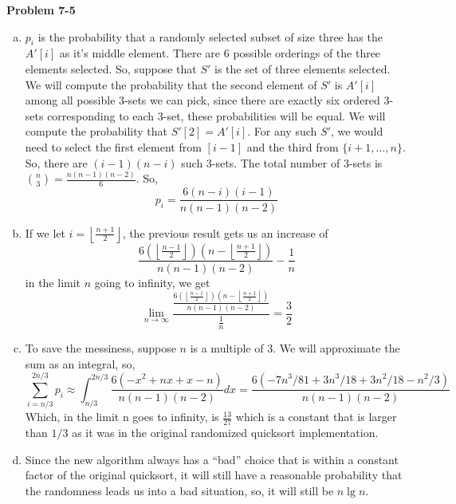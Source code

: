 \documentclass{article}
\begin{document}
\noindent\textbf{Problem 7-5}\\
\begin{enumerate}[a.]
\item
$p_i$ is the probability that a randomly selected subset of size three has the $A'[i]$ as it's middle element. There are $6$ possible orderings of the three elements selected. So, suppose that $S'$ is the set of three elements selected. We will compute the probability that the second element of $S'$ is $A'[i]$ among all possible 3-sets we can pick, since there are exactly six ordered 3-sets corresponding to each 3-set, these probabilities will be equal. We will compute the probability that $S'[2] = A'[i]$. For any such $S'$, we would need to select the first element from $[i-1]$ and the third from $\{i+1,\ldots,n\}$. So, there are $(i-1)(n-i)$ such 3-sets. The total number of 3-sets is $\binom{n}{3} = \frac{n(n-1)(n-2)}{6}$. So, 
\[
p_i = \frac{6(n-i)(i-1)}{n(n-1)(n-2)}
\]

\item
If we let $i = \left\lfloor \frac{n+1}{2}\right\rfloor$, the previous result gets us an increase of 
\[
\frac{6(\left\lfloor\frac{n-1}{2}\right\rfloor)(n -\left\lfloor \frac{n+1}{2}\right\rfloor)}{n(n-1)(n-2)} - \frac{1}{n}
\]
in the limit $n$ going to infinity, we get
\[
\lim_{n\rightarrow \infty} \frac{\frac{6(\left\lfloor\frac{n-1}{2}\right\rfloor)(n -\left\lfloor \frac{n+1}{2}\right\rfloor)}{n(n-1)(n-2)}}{\frac{1}{n}} = \frac{3}{2}
\]

\item

To save the messiness, suppose $n$ is a multiple of 3. We will approximate the sum as an integral, so, 
\[
\sum_{i=n/3}^{2n/3} p_i \approx \int_{n/3}^{2n/3} \frac{6(-x^2+nx+x-n)}{n(n-1)(n-2)}dx = \frac{6(-7n^3/81 + 3n^3/18 + 3n^2/18- n^2/3)}{n(n-1)(n-2)}
\]
Which, in the limit n goes to infinity, is $\frac{13}{27}$ which is a constant that is larger than $1/3$ as it was in the original randomized quicksort implementation.

\item
Since the new algorithm always has a ``bad'' choice that is within a constant factor of the original quicksort, it will still have a reasonable probability that the randomness leads us into a bad situation, so, it will still be $n\lg n$.
\end{enumerate}
\end{document}
